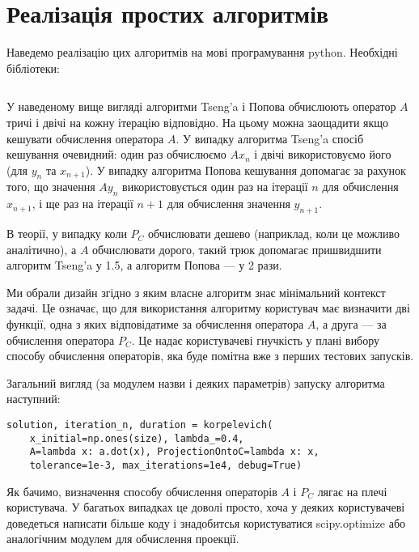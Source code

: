\section{Реалізація простих алгоритмів}

Наведемо реалізацію цих алгоритмів на мові програмування python. Необхідні бібліотеки:
\inputminted[linenos,fontsize=\tiny]{python}{src/__init__.py}

\begin{remark}
    У наведеному вище вигляді алгоритми Tseng'a і Попова обчислюють оператор $A$ тричі і двічі на кожну ітерацію відповідно. На цьому можна заощадити якщо кешувати обчислення оператора $A$. У випадку алгоритма Tseng'a спосіб кешування очевидний: один раз обчислюємо $A x_n$ і двічі використовуємо його (для $y_n$ та $x_{n + 1}$). У випадку алгоритма Попова кешування допомагає за рахунок того, що значення $A y_n$ використовується один раз на ітерації $n$ для обчислення $x_{n + 1}$, і ще раз на ітерації $n + 1$ для обчислення значення $y_{n + 1}$. \medskip
    
    В теорії, у випадку коли $P_C$ обчислювати дешево (наприклад, коли це можливо аналітично), а $A$ обчислювати дорого, такий трюк допомагає пришвидшити алгоритм Tseng'a у 1.5, а алгоритм Попова --- у 2 рази.
\end{remark}

\begin{remark}
    Ми обрали дизайн згідно з яким власне алгоритм знає мінімальний контекст задачі. Це означає, що для використання алгоритму користувач має визначити дві функції, одна з яких відповідатиме за обчислення оператора $A$, а друга --- за обчислення оператора $P_C$. Це надає користувачеві гнучкість у плані вибору способу обчислення операторів, яка буде помітна вже з перших тестових запусків.
\end{remark}

Загальний вигляд (за модулем назви і деяких параметрів) запуску алгоритма наступний:
\begin{verbatim}
solution, iteration_n, duration = korpelevich(
    x_initial=np.ones(size), lambda_=0.4,
    A=lambda x: a.dot(x), ProjectionOntoC=lambda x: x,
    tolerance=1e-3, max_iterations=1e4, debug=True)
\end{verbatim}

Як бачимо, визначення способу обчислення операторів $A$ і $P_C$ лягає на плечі користувача. У багатьох випадках це доволі просто, хоча у деяких користувачеві доведеться написати більше коду і знадобитсья користуватися scipy.optimize або  аналогічним модулем для обчислення проекції.

